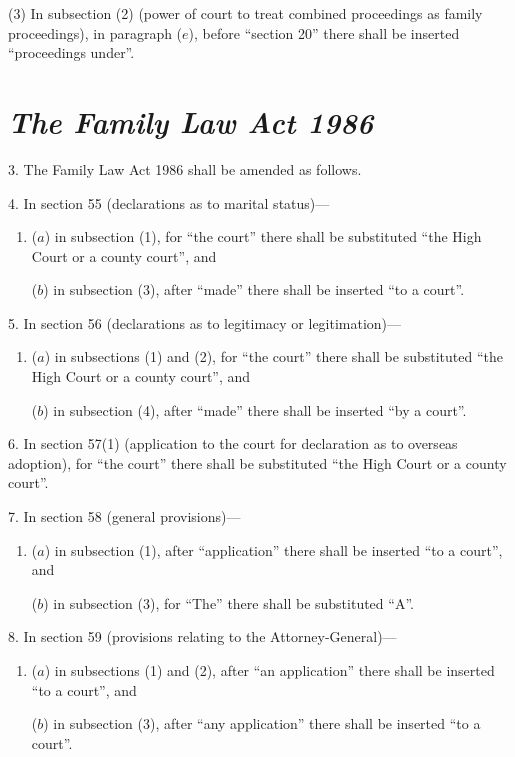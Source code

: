 \documentclass[12pt,a4paper]{article}
\begin{document}
(3) In subsection (2)  (power of court to treat combined proceedings as family proceedings), in paragraph ($e$), before “section 20” there shall be inserted “proceedings under”.

\section*{\itshape The Family Law Act 1986}

3. The Family Law Act 1986 shall be amended as follows.

\medskip

4. In section 55 (declarations as to marital status)—
\begin{enumerate}\item[]
($a$) in subsection (1), for “the court” there shall be substituted “the High Court or a county court”, and

($b$) in subsection (3), after “made” there shall be inserted “to a court”.
\end{enumerate}

\medskip

5. In section 56 (declarations as to legitimacy or legitimation)—
\begin{enumerate}\item[]
($a$) in subsections (1)  and (2), for “the court” there shall be substituted “the High Court or a county court”, and

($b$) in subsection (4), after “made” there shall be inserted “by a court”.
\end{enumerate}

\medskip

6. In section 57(1)  (application to the court for declaration as to overseas adoption), for “the court” there shall be substituted “the High Court or a county court”.

\medskip

7. In section 58 (general provisions)—
\begin{enumerate}\item[]
($a$) in subsection (1), after “application” there shall be inserted “to a court”, and

($b$) in subsection (3), for “The” there shall be substituted “A”.
\end{enumerate}

\medskip

8. In section 59 (provisions relating to the Attorney-General)—
\begin{enumerate}\item[]
($a$) in subsections (1)  and (2), after “an application” there shall be inserted “to a court”, and

($b$) in subsection (3), after “any application” there shall be inserted “to a court”.
\end{enumerate}
\end{document}

